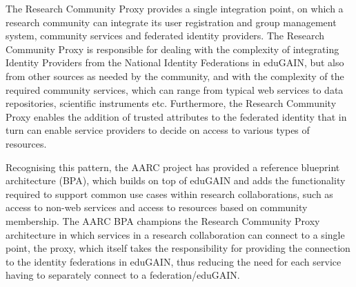 \documentclass[fleqn,10pt]{wlscirep}
\begin{document}
{The Research Community Proxy provides a single integration point, on which a research community can integrate its user registration and group management system, community services and federated identity providers. The Research Community Proxy is responsible for dealing with the complexity of integrating Identity Providers from the National Identity Federations in eduGAIN, but also from other sources as needed by the community, and with the complexity of the required community services, which can range from typical web services to data repositories, scientific instruments etc. Furthermore, the Research Community Proxy enables the addition of trusted attributes to the federated identity that in turn can enable service providers to decide on access to various types of resources.

Recognising this pattern, the AARC project has provided a reference blueprint architecture (BPA)\cite{aarcbpa}, which builds on top of eduGAIN and adds the functionality required to support common use cases within research collaborations, such as access to non-web services and access to resources based on community membership. The AARC BPA champions the Research Community Proxy architecture in which services in a research collaboration can connect to a single point, the proxy, which itself takes the responsibility for providing the connection to the identity federations in eduGAIN, thus reducing the need for each service having to separately connect to a federation/eduGAIN. 

}
\end{document}
